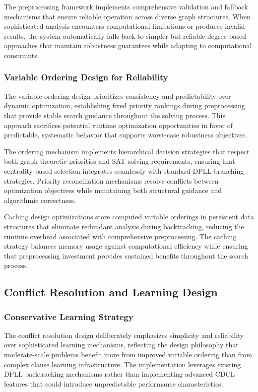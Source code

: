The preprocessing framework implements comprehensive validation and fallback mechanisms that ensure reliable operation across diverse graph structures. When sophisticated analysis encounters computational limitations or produces invalid results, the system automatically falls back to simpler but reliable degree-based approaches that maintain robustness guarantees while adapting to computational constraints.

\subsubsection{Variable Ordering Design for Reliability}

The variable ordering design prioritizes consistency and predictability over dynamic optimization, establishing fixed priority rankings during preprocessing that provide stable search guidance throughout the solving process. This approach sacrifices potential runtime optimization opportunities in favor of predictable, systematic behavior that supports worst-case robustness objectives.

The ordering mechanism implements hierarchical decision strategies that respect both graph-theoretic priorities and SAT solving requirements, ensuring that centrality-based selection integrates seamlessly with standard DPLL branching strategies. Priority reconciliation mechanisms resolve conflicts between optimization objectives while maintaining both structural guidance and algorithmic correctness.

Caching design optimizations store computed variable orderings in persistent data structures that eliminate redundant analysis during backtracking, reducing the runtime overhead associated with comprehensive preprocessing. The caching strategy balances memory usage against computational efficiency while ensuring that preprocessing investment provides sustained benefits throughout the search process.

\subsection{Conflict Resolution and Learning Design}

\subsubsection{Conservative Learning Strategy}

The conflict resolution design deliberately emphasizes simplicity and reliability over sophisticated learning mechanisms, reflecting the design philosophy that moderate-scale problems benefit more from improved variable ordering than from complex clause learning infrastructure. The implementation leverages existing DPLL backtracking mechanisms rather than implementing advanced CDCL features that could introduce unpredictable performance characteristics.

